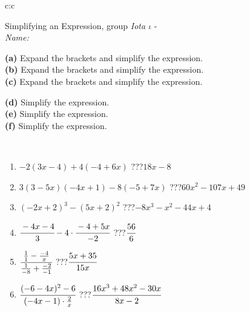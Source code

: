 \documentclass[10pt]{report}
\begin{document}
\newpage
\thispagestyle{empty}
\begin{tabular}{c:c}
\begin{minipage}[c][104.5mm][t]{0.5\linewidth}
\begin{center}
\vspace{7mm}
{\huge Simplifying an Expression, group \textit{Iota $\iota$} -}\\[5mm]
\textit{Name:}\phantom{xxxxxxxxxxxxxxxxxxxxxxxxxxxxxxxxxxxxxxxxxxxxxxxxxxxxxxxxxxxxxxxxx}\\[5mm]
\begin{minipage}{0.95\linewidth}
\begin{center}
{\small \begin{minipage}{0.6\textwidth}
\textbf{(a)} Expand the brackets and simplify the expression. \\[1mm]
\textbf{(b)} Expand the brackets and simplify the expression. \\[1mm]
\textbf{(c)} Expand the brackets and simplify the expression.
\end{minipage} \begin{minipage}{0.39\textwidth}
\textbf{(d)} Simplify the expression. \\[1mm]
\textbf{(e)} Simplify the expression. \\[1mm]
\textbf{(f)} Simplify the expression.
\end{minipage}
}
\end{center}
\end{minipage}
\\[4mm]
\begin{minipage}{0.79\linewidth}
\begin{center}
\begin{varwidth}{\linewidth}
\begin{enumerate}
\normalsize
\item $-2(3x-4)+4(-4+6x)$\quad \dotfill\; ???\;\dotfill \quad $18x-8$
\item $3(3-5x)(-4x+1)-8(-5+7x)$\quad \dotfill\; ???\;\dotfill \quad $60x^2-107x+49$
\item $(-2x+2)^3-(5x+2)^2$\quad \dotfill\; ???\;\dotfill \quad $-8x^3-x^2-44x+4$
\item $\cfrac{-4x-4}{3}-4\cdot\cfrac{-4+5x}{-2}$\quad \dotfill\; ???\;\dotfill \quad $\cfrac{56}{6}$
\item $\cfrac{\frac{1}{1}-\frac{-4}{x}}{\frac{1}{-8}+\frac{-2}{-1}}$\quad \dotfill\; ???\;\dotfill \quad $\cfrac{5x+35}{15x}$
\item $\cfrac{(-6-4x)^2-6}{(-4x-1)\cdot\frac{2}{x}}$\quad \dotfill\; ???\;\dotfill \quad $\cfrac{16x^3+48x^2-30x}{8x-2}$

\end{enumerate}
\end{varwidth}
\end{center}
\end{minipage}
\end{center}
\end{minipage}
\end{tabular}
\end{document}
